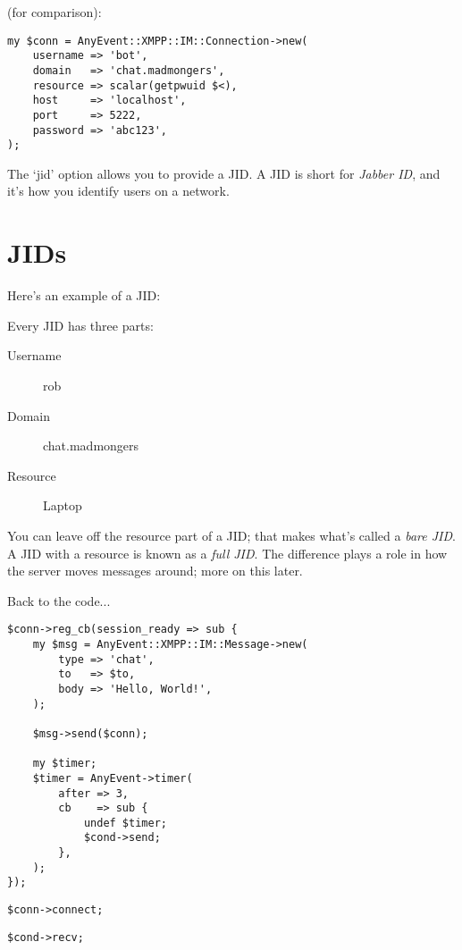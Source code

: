 (for comparison):

\begin{shaded}
\begin{verbatim}
my $conn = AnyEvent::XMPP::IM::Connection->new(
    username => 'bot',
    domain   => 'chat.madmongers',
    resource => scalar(getpwuid $<),
    host     => 'localhost',
    port     => 5222,
    password => 'abc123',
);
\end{verbatim}
\end{shaded}

\pause
The `jid' option allows you to provide a JID.  A JID is short for \textit{Jabber ID}, and it's how
you identify users on a network.

\newpage

\section{JIDs}

\pause

Here's an example of a JID:


\pause

Every JID has three parts:

\pause

\begin{description}
\item[Username] rob
\pause
\item[Domain] chat.madmongers
\pause
\item[Resource] Laptop
\end{description}

\pause

You can leave off the resource part of a JID; that makes what's called a \textit{bare JID}.  A JID with a resource
is known as a \textit{full JID}.  The difference plays a role in how the server moves messages around; more on this later.

\newpage

Back to the code...

\begin{shaded}
\begin{verbatim}
$conn->reg_cb(session_ready => sub {
    my $msg = AnyEvent::XMPP::IM::Message->new(
        type => 'chat',
        to   => $to,
        body => 'Hello, World!',
    );

    $msg->send($conn);

    my $timer;
    $timer = AnyEvent->timer(
        after => 3,
        cb    => sub {
            undef $timer;
            $cond->send;
        },
    );
});
\end{verbatim}
\end{shaded}

\pause
\begin{shaded}
\begin{verbatim}
$conn->connect;
\end{verbatim}
\end{shaded}

\pause
\begin{shaded}
\begin{verbatim}
$cond->recv;
\end{verbatim}
\end{shaded}
